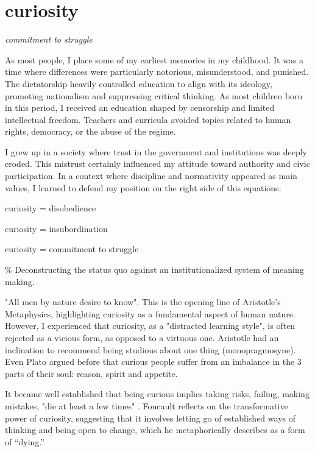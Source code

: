 \chapter*{curiosity}
\begin{center}
\vspace{2cm}
\begin{flushright}
\large
\textit{commitment to struggle}
\end{flushright}
\vspace*{\fill}
\end{center}
\normalsize

As most people, I place some of my earliest memories in my childhood. It was a time where differences were particularly notorious, misunderstood, and punished. The dictatorship heavily controlled education to align with its ideology, promoting nationalism and suppressing critical thinking. As most children born in this period, I received an education shaped by censorship and limited intellectual freedom. Teachers and curricula avoided topics related to human rights, democracy, or the abuse of the regime. 

I grew up in a society where trust in the government and institutions was deeply eroded. This mistrust certainly influenced my attitude toward authority and civic participation. In a context where discipline and normativity appeared as main values, I learned to defend my position on the right side of this equations: 

curiosity = disobedience

curiosity = insubordination

curiosity = commitment to struggle 

{\scriptsize \textcolor{comment}{\%  Deconstructing the status quo against an institutionalized system of meaning making.}}

"All men by nature desire to know". This is the opening line of Aristotle's Metaphysics, highlighting curiosity as a fundamental aspect of human nature.  However, I experienced that curiosity, as a "distracted learning style", is often rejected as a vicious form, as opposed to a virtuous one. Aristotle had an inclination to recommend being studious about one thing (monopragmosyne). Even Plato argued before that curious people suffer from an imbalance in the 3 parts of their soul: reason, spirit and appetite. \citep{perry2020}

It became well established that being curious implies taking risks, failing, making mistakes, "die at least a few times" \citep{foucault1980masked}. Foucault reflects on the transformative power of curiosity, suggesting that it involves letting go of established ways of thinking and being open to change, which he metaphorically describes as a form of “dying.”

